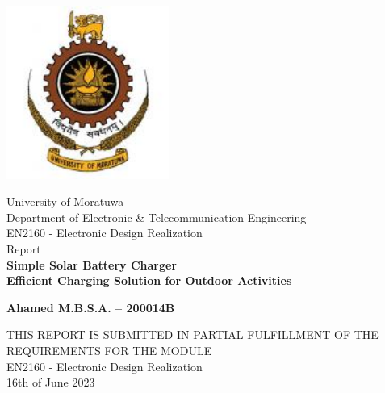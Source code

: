 \documentclass[twocolumn]{article}
\begin{document}
\begin{titlepage}
    \centering
    \vspace*{-2cm}
    \includegraphics[width=0.4\textwidth]{UoM.jpg}
    \vspace{1.5cm}

    {\LARGE University of Moratuwa}\\[0.5cm]
    {\large Department of Electronic \& Telecommunication Engineering}\\[2cm]
    
    {\Large EN2160 - Electronic Design Realization}\\[0.5cm]
    {\Large Report}\\[1.5cm]
    
    \textbf{\Large Simple Solar Battery Charger}\\[1cm]
    \textbf{\Large Efficient Charging Solution for Outdoor Activities}\\[1cm]
    
    \begin{minipage}{0.4\textwidth}
        \begin{flushleft}
        \centering
            \textbf{\large Ahamed M.B.S.A. – 200014B}\\
        \end{flushleft}
    \end{minipage}
    
    \vfill
    
    {\large THIS REPORT IS SUBMITTED IN PARTIAL FULFILLMENT OF THE REQUIREMENTS FOR THE MODULE}\\[0.5cm]
    {\large EN2160 - Electronic Design Realization}\\[0.5cm]
    {\large 16th of June 2023}
    
\end{titlepage}

\begin{abstract}
    A simple solar battery charger is a compact and portable device designed to harness solar energy and convert it into electrical energy for charging rechargeable batteries. With the increasing demand for renewable energy solutions, solar panels have gained popularity as a reliable source of power. However, due to the variable nature of sunlight intensity and environmental conditions, it is crucial to have an effective solar controller to regulate the charging process safely. This charger uses LM338 or LM317 as the solar controller to ensure consistent and safe charging of batteries. Additionally, two LEDs are incorporated to indicate the battery charge level, making it easy to monitor and maintain the battery.
\end{abstract}
\end{document}
